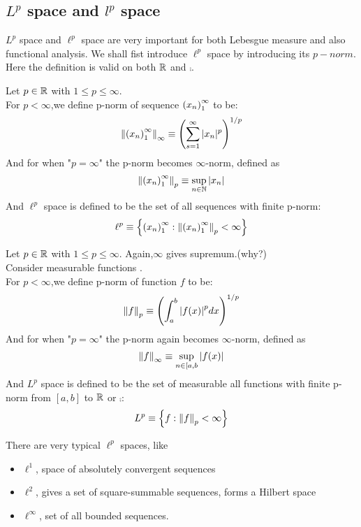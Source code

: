 \documentclass{article}
\begin{document}
\subsection{\texorpdfstring{$L^p$}. space and \texorpdfstring{${l}^p$}. space}
$L^p$ space and $\ell^p$ space are very important for both Lebesgue measure and also functional analysis. We shall fist introduce $\ell^p$ space by introducing its $p-norm$. Here the definition is valid on both $\mathbb{R}$ and $\comp$.

\begin{definition}\rm\nextline
	Let $p\in\mathbb{R}$ with $1\leq p\leq\infty$. \\
	For $p<\infty$,we define p-norm of sequence $\left({x_n}\right)_1^\infty$ to be:
	$$
		\left\|{\left({x_n}\right)_1^\infty}\right\|_\infty\equiv\left(\sum_{s=1}^\infty|x_n|^p\right)^{1/p}
	$$
	And for when "$p=\infty$" the p-norm becomes $\infty$-norm, defined as
	$$
		\left\|{\left({x_n}\right)_1^\infty}\right\|_p\equiv\sup_{n\in\mathbb{N}}|x_n|
	$$
	And $\ell^p$ space is defined to be the set of all sequences with finite p-norm:
	$$
		\ell^p\equiv\left\{\left({x_n}\right)_1^\infty:\left\|{\left({x_n}\right)_1^\infty}\right\|_p<\infty\right\}
	$$
\end{definition}

\begin{definition}\rm\nextline
	Let $p\in\mathbb{R}$ with $1\leq p\leq\infty$. Again,$\infty$ gives supremum.(why?)\\
	Consider measurable functions .\\
	For $p<\infty$,we define p-norm of function $f$ to be:
	$$
		\left\|{f}\right\|_p\equiv\left(\int_a^b{|f(x)|}^p dx \right)^{1/p}
	$$
	And for when "$p=\infty$" the p-norm again becomes $\infty$-norm, defined as
	$$
		\left\|{f}\right\|_\infty\equiv\sup_{n\in[a,b}|f(x)|
	$$
	And $L^p$ space is defined to be the set of measurable all functions with finite p-norm from $[a,b]$ to $\mathbb{R}$ or $\comp$:
	$$
		L^p\equiv\left\{f:\left\|{f}\right\|_p<\infty\right\}
	$$
\end{definition}

\begin{remark}\rm\nextline
	There are very typical $\ell^p$ spaces, like
	\begin{itemize}
		\item $\ell^1$, space of absolutely convergent sequences
		\item $\ell^2$, gives a set of square-summable sequences, forms a Hilbert space
		\item $\ell^\infty$, set of all bounded sequences.
	\end{itemize}

\end{remark}
\end{document}
